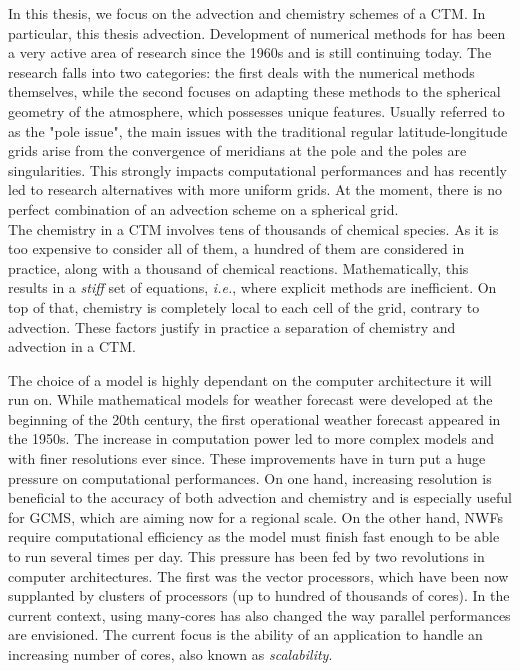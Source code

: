 In this thesis, we focus on the advection and chemistry schemes of a CTM. In
particular, this thesis \DIFdelbegin {}\DIFdelend \DIFaddbegin {}\DIFaddend advection.  Development of numerical methods for
\DIFdelbegin {}\DIFdelend \DIFaddbegin {}\DIFaddend has been a very active area of research since the 1960s and is still
continuing today. The research falls into two categories: the first deals with
the numerical methods themselves, while the second focuses on adapting these
methods to the spherical geometry of the atmosphere, which possesses unique
features. Usually referred to as the "pole issue", the main issues with the
traditional regular latitude-longitude grids arise from the convergence of
meridians at the pole and the poles are singularities. This strongly impacts
computational performances and has recently led to research alternatives with
more uniform grids. At the moment, there is no perfect combination of an
advection scheme on a spherical grid.\\ The chemistry in a CTM involves tens of
thousands of chemical species. As it is too expensive to consider all of them, a
hundred of them are considered in practice, along with a thousand of chemical
reactions. Mathematically, this results in a \textit{stiff} set of equations,
\textit{i.e.}, where explicit methods are inefficient. On top of that, chemistry
is completely local to each cell of the grid, contrary to advection. These
factors justify in practice a separation of chemistry and advection in a CTM.

The choice of a model is highly dependant on the computer architecture it will
run on. While mathematical models for weather forecast were developed at the
beginning of the 20th century, the first operational weather forecast appeared
in the 1950s. The increase in computation power led to more complex models and
with finer resolutions ever since. These improvements have in turn put a huge
pressure on computational performances. On one hand, increasing resolution is
beneficial to the accuracy of both advection and chemistry and is especially
useful for GCMS, which are aiming now for a regional scale. On the other hand,
NWFs require computational efficiency as the model must finish fast enough to be
able to run several times per day. This pressure has been fed by two revolutions
in computer architectures. The first was the vector processors, which have been
now supplanted by clusters of processors (up to hundred of thousands of cores).
In the current context, using many-cores has also changed the way parallel
performances are envisioned. The current focus is the ability of an application to
handle an increasing number of cores, also known as \textit{scalability}.

